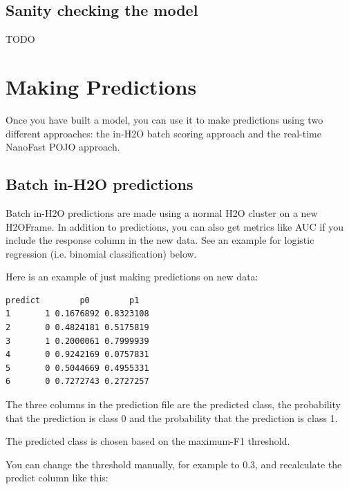 \subsection{Sanity checking the model}

TODO


\section{Making Predictions}

Once you have built a model, you can use it to make predictions using two different approaches:  the in-H2O batch
scoring approach and the real-time NanoFast POJO approach.

\subsection{Batch in-H2O predictions}

Batch in-H2O predictions are made using a normal H2O cluster on a new H2OFrame.  In addition to predictions, you
can also get metrics like AUC if you include the response column in the new data.  See an example for logistic
regression (i.e. binomial classification) below.

\bigskip
\waterExampleInR



Here is an example of just making predictions on new data:


\begin{lstlisting}[style=output]
  predict        p0        p1
1       1 0.1676892 0.8323108
2       0 0.4824181 0.5175819
3       1 0.2000061 0.7999939
4       0 0.9242169 0.0757831
5       0 0.5044669 0.4955331
6       0 0.7272743 0.2727257
\end{lstlisting}

The three columns in the prediction file are the predicted class, the probability that the prediction is class 0
and the probability that the prediction is class 1.

The predicted class is chosen based on the maximum-F1 threshold.

You can change the threshold manually, for example to 0.3, and recalculate the predict column like this:


